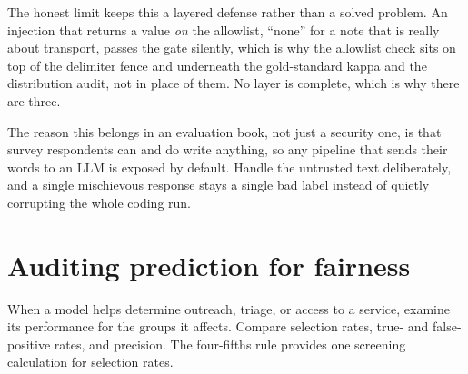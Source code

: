 \documentclass[
    a4paper,
    fontsize=10pt,
    twoside=true,
    numbers=noenddot,
]{kaobook}
\begin{document}
The honest limit keeps this a layered defense rather than a solved problem. An injection that returns a value \emph{on} the allowlist, \enquote{none} for a note that is really about transport, passes the gate silently, which is why the allowlist check sits on top of the delimiter fence and underneath the gold-standard kappa and the distribution audit, not in place of them. No layer is complete, which is why there are three.

The reason this belongs in an evaluation book, not just a security one, is that survey respondents can and do write anything, so any pipeline that sends their words to an LLM is exposed by default. Handle the untrusted text deliberately, and a single mischievous response stays a single bad label instead of quietly corrupting the whole coding run.

\section{Auditing prediction for fairness}\label{sec:fairness}
When a model helps determine outreach, triage, or access to a service, examine its performance for the groups it affects. Compare selection rates, true- and false-positive rates, and precision. The four-fifths rule provides one screening calculation for selection rates.
\end{document}
